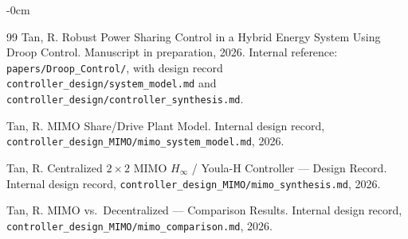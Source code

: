 \documentclass[energies,article,submit,pdftex,oneauthor]{Definitions/mdpi}
\begin{document}
\begin{adjustwidth}{-\extralength}{0cm}
\begin{thebibliography}{99}
Tan, R. Robust Power Sharing Control in a Hybrid Energy System Using Droop Control. Manuscript
in preparation, 2026. Internal reference: \texttt{papers/Droop\_Control/}, with design record
\texttt{controller\_design/system\_model.md} and
\texttt{controller\_design/controller\_synthesis.md}.

Tan, R. MIMO Share/Drive Plant Model. Internal design record,
\texttt{controller\_design\_MIMO/mimo\_system\_model.md}, 2026.

Tan, R. Centralized $2\times2$ MIMO $H_\infty$ / Youla-H Controller --- Design Record. Internal
design record, \texttt{controller\_design\_MIMO/}\allowbreak\texttt{mimo\_synthesis.md}, 2026.

Tan, R. MIMO vs.\ Decentralized --- Comparison Results. Internal design record,
\texttt{controller\_design\_MIMO/mimo\_comparison.md}, 2026.

\end{thebibliography}

\PublishersNote{}
\end{adjustwidth}
\end{document}
